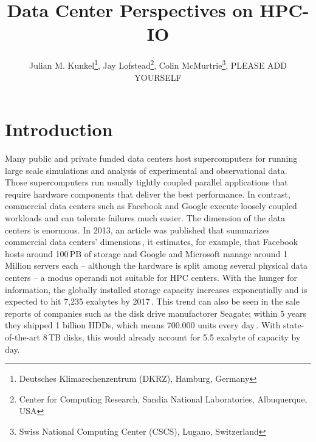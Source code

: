 \documentclass{superfri}
\numberwithin{equation}{section}
\begin{document}

\author{Julian M. Kunkel\footnote{\label{dkrz}Deutsches Klimarechenzentrum (DKRZ), Hamburg, Germany}, 
Jay Lofstead\footnote{Center for Computing Research, Sandia National Laboratories, Albuquerque, USA}, 
Colin McMurtrie\footnote{Swiss National Computing Center (CSCS), Lugano, Switzerland}, 
PLEASE ADD YOURSELF
} %

\title{Data Center Perspectives on HPC-IO}
\maketitle{}

\begin{abstract}

\noindent
{}
\end{abstract}

\section{Introduction}
\label{sec:intro}

Many public and private funded data centers host supercomputers for running large scale simulations and analysis of experimental and observational data.
Those supercomputers run usually tightly coupled parallel applications that require hardware components that deliver the best performance.
In contrast, commercial data centers such as Facebook and Google execute loosely coupled workloads and can tolerate failures much easier.
The dimension of the data centers is enormous.
In 2013, an article was published that summarizes commercial data centers' dimensions\,\cite{data13}, it estimates, for example, that 
Facebook hosts around 100\,PB of storage and Google and Microsoft manage around 1 Million servers each -- although the hardware is split among several physical data centers -- a modus operandi not suitable for HPC centers.
With the hunger for information, the globally installed storage capacity increases exponentially and is expected to hit 7,235 exabytes by 2017\,\cite{EXA13}.
This trend can also be seen in the sale reports of companies such as the disk drive manufactorer Seagate; within 5 years they shipped 1 billion HDDs, which means 700.000 units every day\,\cite{SG14}.  
With state-of-the-art 8\,TB disks, this would already account for 5.5 exabyte of capacity by day.
\end{document}
